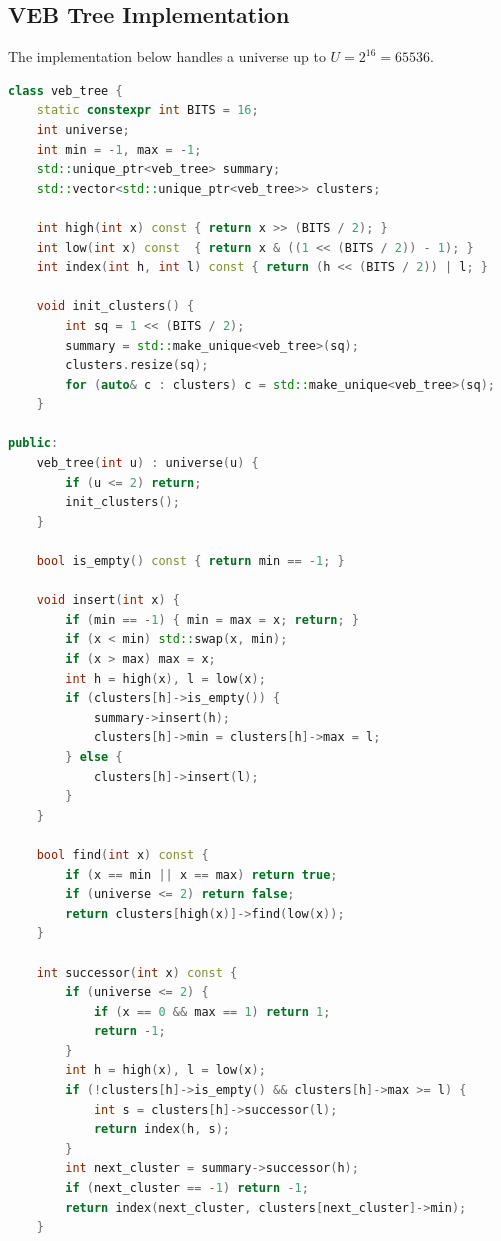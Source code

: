 \subsection{VEB Tree Implementation}

The implementation below handles a universe up to $U = 2^{16} = 65536$.

\begin{lstlisting}[language=C++]
class veb_tree {
    static constexpr int BITS = 16;
    int universe;
    int min = -1, max = -1;
    std::unique_ptr<veb_tree> summary;
    std::vector<std::unique_ptr<veb_tree>> clusters;

    int high(int x) const { return x >> (BITS / 2); }
    int low(int x) const  { return x & ((1 << (BITS / 2)) - 1); }
    int index(int h, int l) const { return (h << (BITS / 2)) | l; }

    void init_clusters() {
        int sq = 1 << (BITS / 2);
        summary = std::make_unique<veb_tree>(sq);
        clusters.resize(sq);
        for (auto& c : clusters) c = std::make_unique<veb_tree>(sq);
    }

public:
    veb_tree(int u) : universe(u) {
        if (u <= 2) return;
        init_clusters();
    }

    bool is_empty() const { return min == -1; }

    void insert(int x) {
        if (min == -1) { min = max = x; return; }
        if (x < min) std::swap(x, min);
        if (x > max) max = x;
        int h = high(x), l = low(x);
        if (clusters[h]->is_empty()) {
            summary->insert(h);
            clusters[h]->min = clusters[h]->max = l;
        } else {
            clusters[h]->insert(l);
        }
    }

    bool find(int x) const {
        if (x == min || x == max) return true;
        if (universe <= 2) return false;
        return clusters[high(x)]->find(low(x));
    }

    int successor(int x) const {
        if (universe <= 2) {
            if (x == 0 && max == 1) return 1;
            return -1;
        }
        int h = high(x), l = low(x);
        if (!clusters[h]->is_empty() && clusters[h]->max >= l) {
            int s = clusters[h]->successor(l);
            return index(h, s);
        }
        int next_cluster = summary->successor(h);
        if (next_cluster == -1) return -1;
        return index(next_cluster, clusters[next_cluster]->min);
    }


\end{lstlisting}
